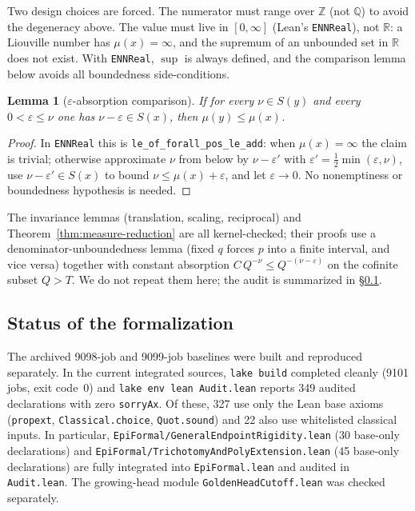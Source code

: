 \documentclass[11pt]{amsart}
\newtheorem{lemma}[theorem]{Lemma}
\theoremstyle{definition}
\theoremstyle{remark}
\numberwithin{equation}{section}
\newcommand{\Q}{\mathbb{Q}}
\newcommand{\R}{\mathbb{R}}
\newcommand{\Z}{\mathbb{Z}}
\newcommand{\irr}{\mu}
\begin{document}
Two design choices are forced. The numerator must range over $\Z$ (not $\Q$) to avoid the degeneracy above. The value must live in $[0,\infty]$ (Lean's \texttt{ENNReal}), not $\R$: a Liouville number has $\irr(x)=\infty$, and the supremum of an unbounded set in $\R$ does not exist. With \texttt{ENNReal}, $\sup$ is always defined, and the comparison lemma below avoids all boundedness side-conditions.

\begin{lemma}[$\varepsilon$-absorption comparison]\label{lem:eps-abs}
If for every $\nu\in S(y)$ and every $0<\varepsilon\le\nu$ one has $\nu-\varepsilon\in S(x)$, then $\irr(y)\le\irr(x)$.
\end{lemma}
\begin{proof}
In \texttt{ENNReal} this is \texttt{le\_\allowbreak{}of\_\allowbreak{}forall\_\allowbreak{}pos\_\allowbreak{}le\_\allowbreak{}add}: when $\irr(x)=\infty$ the claim is trivial; otherwise approximate $\nu$ from below by $\nu-\varepsilon'$ with $\varepsilon'=\tfrac12\min(\varepsilon,\nu)$, use $\nu-\varepsilon'\in S(x)$ to bound $\nu\le\irr(x)+\varepsilon$, and let $\varepsilon\to0$. No nonemptiness or boundedness hypothesis is needed.
\end{proof}

The invariance lemmas (translation, scaling, reciprocal) and Theorem~\ref{thm:measure-reduction} are all kernel-checked; their proofs use a denominator-unboundedness lemma (fixed $q$ forces $p$ into a finite interval, and vice versa) together with constant absorption $C\,Q^{-\nu}\le Q^{-(\nu-\varepsilon)}$ on the cofinite subset $Q>T$. We do not repeat them here; the audit is summarized in \S\ref{sec:lean-status}.

\subsection{Status of the formalization}\label{sec:lean-status}

The archived 9098-job and 9099-job baselines were built and reproduced separately.
In the current integrated sources, \texttt{lake build} completed cleanly
(9101 jobs, exit code~0) and \texttt{lake env lean Audit.lean} reports
349 audited declarations with zero \texttt{sorryAx}. Of these, 327 use
only the Lean base axioms (\texttt{propext}, \texttt{Classical.choice},
\texttt{Quot.sound}) and 22 also use whitelisted classical inputs.
In particular, \texttt{EpiFormal/\allowbreak{}GeneralEndpoint\allowbreak{}Rigidity.lean}
(30 base-only declarations) and
\texttt{EpiFormal/\allowbreak{}TrichotomyAnd\allowbreak{}PolyExtension.lean}
(45 base-only declarations) are fully integrated into \texttt{EpiFormal.lean}
and audited in \texttt{Audit.lean}.
The growing-head module \texttt{GoldenHeadCutoff.lean} was checked separately.
\end{document}
